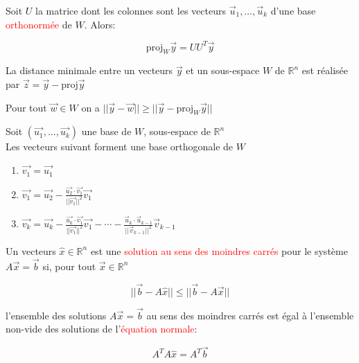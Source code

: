     \begin{theoreme}
        Soit $U$ la matrice dont les colonnes sont les vecteurs $\vec{u}_1, \dots, \vec{u}_k$ d'une base \textcolor{red}{orthonormée} de $W$. Alors:

        \begin{formule}
            \[\text{proj}_W\vec{y} = UU^T\vec{y}\]
        \end{formule}
    \end{theoreme}
    La distance minimale entre un vecteurs $\vec{y}$ et un sous-espace $W$ de $\mathbb{R}^n$ est réalisée par $\vec{z} = \vec{y} - \text{proj}\vec{y}$
    \begin{theoreme}
        Pour tout $\vec{w} \in W$ on a $||\vec{y} - \vec{w}|| \geq ||\vec{y} - \text{proj}_W\vec{y}||$
    \end{theoreme}
    \begin{theoreme}
        Soit $(\vec{u_1}, \dots, \vec{u_k})$ une base de $W$, sous-espace de $\mathbb{R}^n$\\
        Les vecteurs suivant forment une base orthogonale de $W$
        \begin{enumerate}
            \item $\vec{v_1} = \vec{u_1}$
            \item $\vec{v_1} = \vec{u_2} - \frac{\vec{u_2}\cdot \vec{v_1}}{||\vec{v_1}||^2}\vec{v_1}$
            \item $\vec{v_k} = \vec{u_k} - \frac{\vec{u_k}\cdot\vec{v_1}}{||\vec{v_1}||^2}\vec{v_1} - \cdots - \frac{\vec{u}_k\cdot\vec{u}_{k-1}}{||\vec{v}_{k-1}||^2}\vec{v}_{k-1}$
        \end{enumerate}
    \end{theoreme}
    \begin{definition}
        Un vecteurs $\hat{x} \in \mathbb{R}^n$ est une \textcolor{red}{solution au sens des moindres carrés} pour le système $A\vec{x} = \vec{b}$ si, pour tout $\vec{x} \in \mathbb{R}^n$
        \begin{formule}
            \[||\vec{b}-A\hat{x}|| \leq ||\vec{b} - A\vec{x}||\]
        \end{formule}
        
    \end{definition}
\begin{theoreme}
l'ensemble des solutions $A\vec{x} = \vec{b}$ au sens des moindres carrés est égal à l'ensemble non-vide des solutions de l'\textcolor{red}{équation normale}:
\begin{formule}
    \[A^TA\hat{x} = A^T\vec{b}\]
\end{formule}
\end{theoreme}
